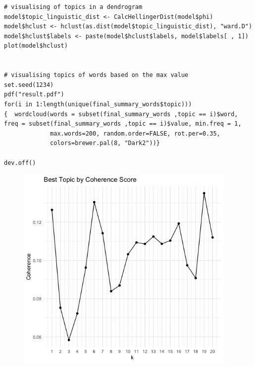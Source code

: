 \documentclass{article}
\begin{document}
\begin{lstlisting}
# visualising of topics in a dendrogram 
model$topic_linguistic_dist <- CalcHellingerDist(model$phi)
model$hclust <- hclust(as.dist(model$topic_linguistic_dist), "ward.D")
model$hclust$labels <- paste(model$hclust$labels, model$labels[ , 1])
plot(model$hclust)


# visualising topics of words based on the max value
set.seed(1234)
pdf("result.pdf")
for(i in 1:length(unique(final_summary_words$topic)))
{  wordcloud(words = subset(final_summary_words ,topic == i)$word, freq = subset(final_summary_words ,topic == i)$value, min.freq = 1,
             max.words=200, random.order=FALSE, rot.per=0.35, 
             colors=brewer.pal(8, "Dark2"))}

dev.off()
\end{lstlisting}

\begin{figure}[H]
    \includegraphics[width=0.95\textwidth]{Fig1}
\end{figure}
\end{document}
